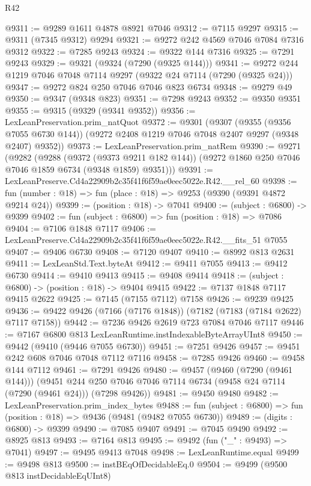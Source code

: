 \begin{lexlean}{R42}
\begin{coremodule}
{@9311 := @9289 @1611 @4878 @8921 @7046
@9312 := @7115 @9297
@9315 := @9311 (@7345 @9312) @9294
@9321 := @9272 @242 @4569 @7046 @7084 @7316 @9312
@9322 := @7285 @9243
@9324 := @9322 @144 @7316
@9325 := @7291 @9243
@9329 := @9321 (@9324 (@7290 (@9325 @144)))
@9341 := @9272 @244 @1219 @7046 @7048 @7114 @9297 (@9322 @24 @7114 (@7290 (@9325 @24)))
@9347 := @9272 @824 @250 @7046 @7046 @823 @6734
@9348 := @9279 @49
@9350 := @9347 (@9348 @823)
@9351 := @7298 @9243
@9352 := @9350 @9351
@9355 := @9315 (@9329 (@9341 @9352))
@9356 := LexLeanPreservation.prim_natQuot
@9372 := @9301
    (@9307
      (@9355 (@9356 @7055 @6730 @144))
      (@9272 @2408 @1219 @7046 @7048 @2407 @9297 (@9348 @2407) @9352))
@9373 := LexLeanPreservation.prim_natRem
@9390 := @9271
    (@9282
      (@9288
        (@9372 (@9373 @9211 @182 @144))
        (@9272 @1860 @250 @7046 @7046 @1859 @6734 (@9348 @1859) @9351)))
@9391 := LexLeanPreserve.Cd4a22909b2c35f41f6f59ae0eec5022e.R42.__rel_60
@9398 := fun (number : @18) => fun (place : @18) => @9253 (@9390 (@9391 @4872 @9214 @24))
@9399 := (position : @18) -> @7041
@9400 := (subject : @6800) -> @9399
@9402 := fun (subject : @6800) => fun (position : @18) => @7086
@9404 := @7106 @1848 @7117
@9406 := LexLeanPreserve.Cd4a22909b2c35f41f6f59ae0eec5022e.R42.__fits_51 @7055
@9407 := @9406 @6730
@9408 := @7120 @9407
@9410 := @8992 @813 @2631
@9411 := LexLeanStd.Text.byteAt
@9412 := @9411 @7055
@9413 := @9412 @6730
@9414 := @9410 @9413
@9415 := @9408 @9414
@9418 := (subject : @6800) -> (position : @18) -> @9404 @9415
@9422 := @7137 @1848 @7117 @9415 @2622
@9425 := @7145 (@7155 @7112) @7158
@9426 := @9239 @9425
@9436 := @9422 @9426 (@7166 (@7176 @1848)) (@7182 (@7183 (@7184 @2622) @7117 @7158))
@9442 := @7236 @9426 @2619 @723 @7084 @7046 @7117
@9446 := @7167 @6800 @813 LexLeanRuntime.instIndexableByteArrayUInt8
@9450 := @9442 (@9410 (@9446 @7055 @6730))
@9451 := @7251 @9426
@9457 := @9451 @242 @608 @7046 @7048 @7112 @7116
@9458 := @7285 @9426
@9460 := @9458 @144 @7112
@9461 := @7291 @9426
@9480 := @9457
    (@9460 (@7290 (@9461 @144)))
    (@9451 @244 @250 @7046 @7046 @7114 @6734 (@9458 @24 @7114 (@7290 (@9461 @24))) (@7298 @9426))
@9481 := @9450 @9480
@9482 := LexLeanPreservation.prim_index_bytes
@9488 := fun (subject : @6800) => fun (position : @18) => @9436 (@9481 (@9482 @7055 @6730))
@9489 := (digits : @6800) -> @9399
@9490 := @7085 @9407
@9491 := @7045 @9490
@9492 := @8925 @813
@9493 := @7164 @813
@9495 := @9492 (fun ("_" : @9493) => @7041)
@9497 := @9495 @9413 @7048
@9498 := LexLeanRuntime.equal
@9499 := @9498 @813
@9500 := instBEqOfDecidableEq.{0}
@9504 := @9499 (@9500 @813 instDecidableEqUInt8)
}
\end{coremodule}
\end{lexlean}
